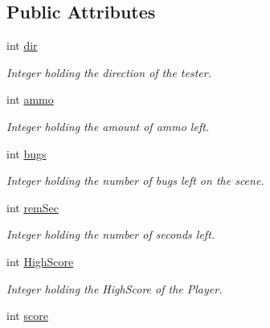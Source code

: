 \subsection*{Public Attributes}
\begin{DoxyCompactItemize}
\item 
\hypertarget{classGame2Scene_a8fd17e269efbee9884476ffef2c8d334}{int \hyperlink{classGame2Scene_a8fd17e269efbee9884476ffef2c8d334}{dir}}\label{classGame2Scene_a8fd17e269efbee9884476ffef2c8d334}

\begin{DoxyCompactList}\small\item\em Integer holding the direction of the tester. \end{DoxyCompactList}\item 
\hypertarget{classGame2Scene_a4e79ed93f76dbbdd93398f4095b1a656}{int \hyperlink{classGame2Scene_a4e79ed93f76dbbdd93398f4095b1a656}{ammo}}\label{classGame2Scene_a4e79ed93f76dbbdd93398f4095b1a656}

\begin{DoxyCompactList}\small\item\em Integer holding the amount of ammo left. \end{DoxyCompactList}\item 
\hypertarget{classGame2Scene_a6f7f39f987cfe21e8d75830dd017e64f}{int \hyperlink{classGame2Scene_a6f7f39f987cfe21e8d75830dd017e64f}{bugs}}\label{classGame2Scene_a6f7f39f987cfe21e8d75830dd017e64f}

\begin{DoxyCompactList}\small\item\em Integer holding the number of bugs left on the scene. \end{DoxyCompactList}\item 
\hypertarget{classGame2Scene_a9d666b1476d029c2db3d6361bef2b459}{int \hyperlink{classGame2Scene_a9d666b1476d029c2db3d6361bef2b459}{rem\-Sec}}\label{classGame2Scene_a9d666b1476d029c2db3d6361bef2b459}

\begin{DoxyCompactList}\small\item\em Integer holding the number of seconds left. \end{DoxyCompactList}\item 
\hypertarget{classGame2Scene_a298f56523cb98584b0bacc31bec34984}{int \hyperlink{classGame2Scene_a298f56523cb98584b0bacc31bec34984}{High\-Score}}\label{classGame2Scene_a298f56523cb98584b0bacc31bec34984}

\begin{DoxyCompactList}\small\item\em Integer holding the High\-Score of the Player. \end{DoxyCompactList}\item 
\hypertarget{classGame2Scene_a9a1966f21f97f746433e5425aa9b8ea3}{int \hyperlink{classGame2Scene_a9a1966f21f97f746433e5425aa9b8ea3}{score}}\label{classGame2Scene_a9a1966f21f97f746433e5425aa9b8ea3}


\end{DoxyCompactItemize}
